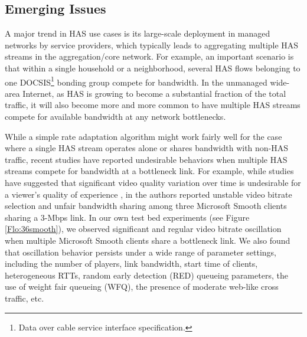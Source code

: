 \documentclass[conference]{IEEEtran}
\theoremstyle{plain}
\theoremstyle{definition}
\theoremstyle{plain}
\theoremstyle{plain}
\begin{document}
\vspace{-0.07in}


\subsection{Emerging Issues}

A major trend in HAS use cases is its large-scale deployment in managed
networks by service providers, which typically leads to aggregating
multiple HAS streams in the aggregation/core network. For example,
an important scenario is that within a single household or a neighborhood,
several HAS flows belonging to one DOCSIS\footnote{Data over cable service interface specification.} bonding group compete for bandwidth. In the unmanaged wide-area Internet,
as HAS is growing to become a substantial fraction of the total traffic,
it will also become more and more common to have multiple HAS streams
compete for available bandwidth at any network bottlenecks. 

While a simple rate adaptation algorithm might work fairly well for
the case where a single HAS stream operates alone or shares bandwidth
with non-HAS traffic, recent studies \cite{Jiang:CoNext12,Akhshabi:NOSSDAV12}
have reported undesirable behaviors when multiple HAS streams compete
for bandwidth at a bottleneck link. For example, while studies have
suggested that significant video quality variation over time is undesirable
for a viewer's quality of experience \cite{Mok:WMUST2011}, in \cite{Jiang:CoNext12}
the authors reported unstable video bitrate selection and unfair bandwidth
sharing among three Microsoft Smooth clients sharing a 3-Mbps link.
In our own test bed experiments (see Figure \ref{Flo:36smooth}),
we observed significant and regular video bitrate oscillation when
multiple Microsoft Smooth clients share a bottleneck link. We also
found that oscillation behavior persists under a wide range of parameter
settings, including the number of players, link bandwidth, start time
of clients, heterogeneous RTTs, random early detection (RED) queueing
parameters, the use of weight fair queueing (WFQ), the presence of
moderate web-like cross traffic, etc. 
\end{document}
